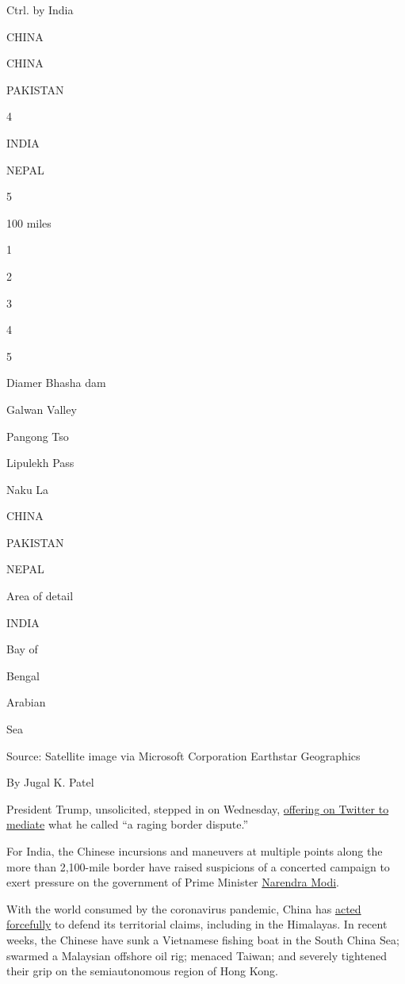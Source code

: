 Ctrl. by India

CHINA

CHINA

PAKISTAN

4

INDIA

NEPAL

5

100 miles

1

2

3

4

5

Diamer Bhasha dam

Galwan Valley

Pangong Tso

Lipulekh Pass

Naku La

CHINA

PAKISTAN

NEPAL

Area of detail

INDIA

Bay of

Bengal

Arabian

Sea

Source: Satellite image via Microsoft Corporation Earthstar Geographics

By Jugal K. Patel

President Trump, unsolicited, stepped in on Wednesday,
\href{https://twitter.com/realDonaldTrump/status/1265604027678670848}{offering
on Twitter to mediate} what he called ``a raging border dispute.''

For India, the Chinese incursions and maneuvers at multiple points along
the more than 2,100-mile border have raised suspicions of a concerted
campaign to exert pressure on the government of Prime Minister
\href{https://www.nytimes.com/2020/06/17/world/asia/india-china-border-clashes.html}{Narendra
Modi}.

With the world consumed by the coronavirus pandemic, China has
\href{https://www.nytimes.com/2020/05/24/world/asia/china-hong-kong-taiwan.html}{acted
forcefully} to defend its territorial claims, including in the
Himalayas. In recent weeks, the Chinese have sunk a Vietnamese fishing
boat in the South China Sea; swarmed a Malaysian offshore oil rig;
menaced Taiwan; and severely tightened their grip on the semiautonomous
region of Hong Kong.

